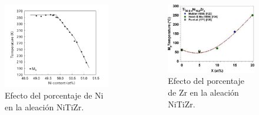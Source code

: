 \documentclass[11pt]{beamer}
\begin{document}
			\begin{frame}
				\begin{columns}
					\begin{column}{.49\textwidth}
						\begin{figure}
							\includegraphics[scale=0.32]{img/MsNiDependence.png}
							\caption*{Efecto del porcentaje de Ni en la aleación NiTiZr.}
						\end{figure}
					\end{column}
					\begin{column}{.49\textwidth}
						\begin{figure}
							\includegraphics[scale=0.32]{img/MsZrDependence.jpeg}
							\caption*{Efecto del porcentaje de Zr en la aleación NiTiZr.}				
						\end{figure}
					\end{column}
				\end{columns}
			\end{frame}
			
\end{document}
